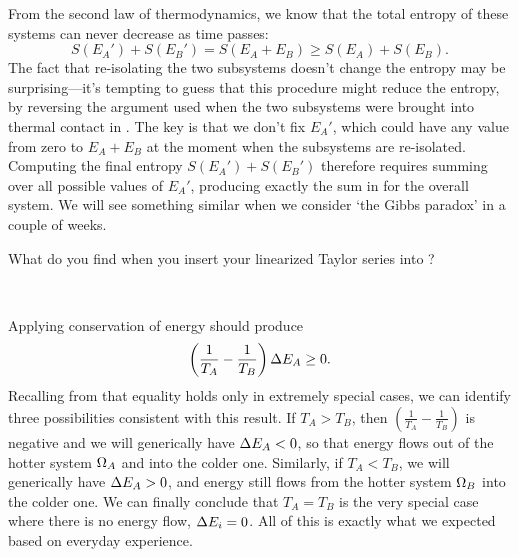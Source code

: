 From the second law of thermodynamics, we know that the total entropy of these systems can never decrease as time passes:
\begin{equation}
  \label{eq:entropy_ineq}
  S(E_A') + S(E_B') = S(E_A + E_B) \geq S(E_A) + S(E_B).
\end{equation}
The fact that re-isolating the two subsystems doesn't change the entropy may be surprising---it's tempting to guess that this procedure might reduce the entropy, by reversing the argument used when the two subsystems were brought into thermal contact in .
The key is that we don't fix $E_A'$, which could have any value from zero to $E_A + E_B$ at the moment when the subsystems are re-isolated.
Computing the final entropy $S(E_A') + S(E_B')$ therefore requires summing over all possible values of $E_A'$, producing exactly the sum in  for the overall system.
We will see something similar when we consider `the Gibbs paradox' in a couple of weeks.

\newpage %
What do you find when you insert your linearized Taylor series into ?
\begin{mdframed}
  \ \\[100 pt]
\end{mdframed}
Applying conservation of energy should produce
\begin{equation*}
  \left(\frac{1}{T_A} - \frac{1}{T_B}\right) \Delta E_A \geq 0.
\end{equation*}
Recalling from  that equality holds only in extremely special cases, we can identify three possibilities consistent with this result.
If $T_A > T_B$, then $\left(\frac{1}{T_A} - \frac{1}{T_B}\right)$ is negative and we will generically have $\Delta E_A < 0$, so that energy flows out of the hotter system $\Omega_A$ and into the colder one.
Similarly, if $T_A < T_B$, we will generically have $\Delta E_A > 0$, and energy still flows from the hotter system $\Omega_B$ into the colder one.
We can finally conclude that $T_A = T_B$ is the very special case where there is no energy flow, $\Delta E_i = 0$.
All of this is exactly what we expected based on everyday experience.
